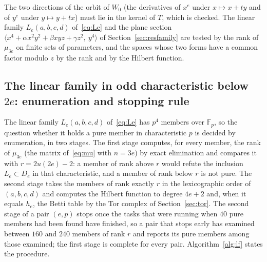 \documentclass[11pt]{article}
\theoremstyle{definition}
\theoremstyle{remark}
\newcommand{\F}{\mathbb{F}}
\begin{document}
The two directions of the orbit of $W_0$ (the derivatives of $x^e$ under $x\mapsto x+ty$ and of $y^e$ under $y\mapsto y+tx$) must lie in the kernel of $T$, which is checked. The linear family $L_e(a,b,c,d)$ of~\eqref{eq:Le} and the plane section $\langle x^4+\alpha x^2y^2+\beta xyz+\gamma z^2,\ y^4\rangle$ of Section~\ref{sec:resfamily} are tested by the rank of $\mu_{3e}$ on finite sets of parameters, and the spaces whose two forms have a common factor modulo $z$ by the rank and by the Hilbert function.

\subsection{The linear family in odd characteristic below \texorpdfstring{$2e$}{2e}: enumeration and stopping rule}
\label{sec:lfmethods}

The linear family $L_e(a,b,c,d)$ of~\eqref{eq:Le} has $p^4$ members over $\F_p$, so the question whether it holds a pure member in characteristic $p$ is decided by enumeration, in two stages. The first stage computes, for every member, the rank of $\mu_{3e}$ (the matrix of~\eqref{eq:mu} with $n=3e$) by exact elimination and compares it with $r=2u(2e)-2$: a member of rank above $r$ would refute the inclusion $L_e\subset D_e$ in that characteristic, and a member of rank below $r$ is not pure. The second stage takes the members of rank exactly $r$ in the lexicographic order of $(a,b,c,d)$ and computes the Hilbert function to degree $4e+2$ and, when it equals $h_e$, the Betti table by the Tor complex of Section~\ref{sec:tor}. The second stage of a pair $(e,p)$ stops once the tasks that were running when $40$ pure members had been found have finished, so a pair that stops early has examined between $160$ and $240$ members of rank $r$ and reports its pure members among those examined; the first stage is complete for every pair. Algorithm~\ref{alg:lf} states the procedure.
\end{document}
